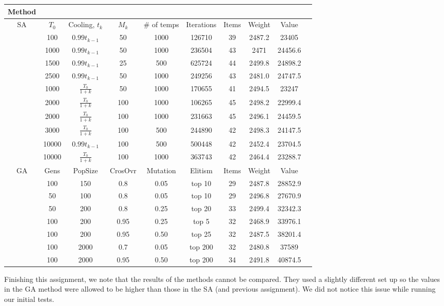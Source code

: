 \documentclass[11pt]{article}
\begin{document}
\begin{enumerate}
\begin{tabular}{c*{9}{c}}
Method\\ \hline
SA&$T_0$&Cooling, $t_k$&$M_k$& \# of temps&Iterations&Items&Weight&Value\\ \hline
&100&$0.99t_{k-1}$&50&1000&126710&39&2487.2&23405\\
&1000&$0.99t_{k-1}$&50&1000&236504&43&2471&24456.6\\
&1500&$0.99t_{k-1}$&25&500&625724&44&2499.8&24898.2\\
&2500&$0.99t_{k-1}$&50&1000&249256&43&2481.0&24747.5\\
&1000&$\frac{T_0}{1+k}$&50&1000&170655&41&2494.5&23247\\
&2000&$\frac{T_0}{1+k}$&100&1000&106265&45&2498.2&22999.4\\
&2000&$\frac{T_0}{1+k}$&100&1000&231663&45&2496.1&24459.5\\
&3000&$\frac{T_0}{1+k}$&100&500&244890&42&2498.3&24147.5\\ 
&10000&$0.99t_{k-1}$&100&500&500448&42&2452.4&23704.5\\
&10000&$\frac{T_0}{1+k}$&100&1000&363743&42&2464.4&23288.7\\
\hline
GA&Gens&PopSize&CrosOvr&Mutation& Elitism &Items&Weight&Value\\ \hline
&100&150&0.8&0.05&top 10&29&2487.8&28852.9\\
&50&100&0.8&0.05&top 10&29&2496.8&27670.9\\
&50&200&0.8&0.25&top 20&33&2499.4&32342.3\\
&100&200&0.95&0.25&top 5&32&2468.9&33976.1\\
&100&200&0.95&0.50&top 25&32&2487.5&38201.4\\
&100&2000&0.7&0.05&top 200&32&2480.8&37589\\
&100&2000&0.95&0.50&top 200&34&2491.8&40874.5\\

\hline
\end{tabular}
Finishing this assignment, we note that the results of the methods cannot be compared.  They used a slightly different set up so the values in the GA method were allowed to be higher than those in the SA (and previous assignment).  We did not notice this issue while running our initial tests.
\end{enumerate}
\end{document}
